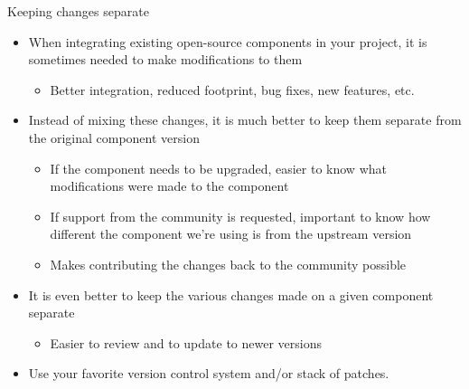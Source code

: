 \begin{frame}{Keeping changes separate}
  \begin{itemize}
  \item When integrating existing open-source components in your
    project, it is sometimes needed to make modifications to them
    \begin{itemize}
    \item Better integration, reduced footprint, bug fixes, new
      features, etc.
    \end{itemize}
  \item Instead of mixing these changes, it is much better to keep
    them separate from the original component version
    \begin{itemize}
    \item If the component needs to be upgraded, easier to know what
      modifications were made to the component
    \item If support from the community is requested, important to
      know how different the component we're using is from the
      upstream version
    \item Makes contributing the changes back to the community
      possible
    \end{itemize}
  \item It is even better to keep the various changes made on a given
    component separate
    \begin{itemize}
    \item Easier to review and to update to newer versions
    \end{itemize}
  \item Use your favorite version control system and/or stack of
    patches.
  \end{itemize}
\end{frame}
